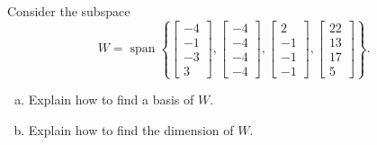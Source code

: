
\begin{exerciseStatement}


Consider the subspace \[W=\operatorname{span}  \left\{ \left[\begin{array}{c}
-4 \\
-1 \\
-3 \\
3
\end{array}\right] , \left[\begin{array}{c}
-4 \\
-4 \\
-4 \\
-4
\end{array}\right] , \left[\begin{array}{c}
2 \\
-1 \\
-1 \\
-1
\end{array}\right] , \left[\begin{array}{c}
22 \\
13 \\
17 \\
5
\end{array}\right] \right\} .\]


\begin{enumerate}[(a)]
\item  Explain how to find a basis of \(W\).
\item  Explain how to find the dimension of \(W\).
\end{enumerate}
    
\end{exerciseStatement}
    
